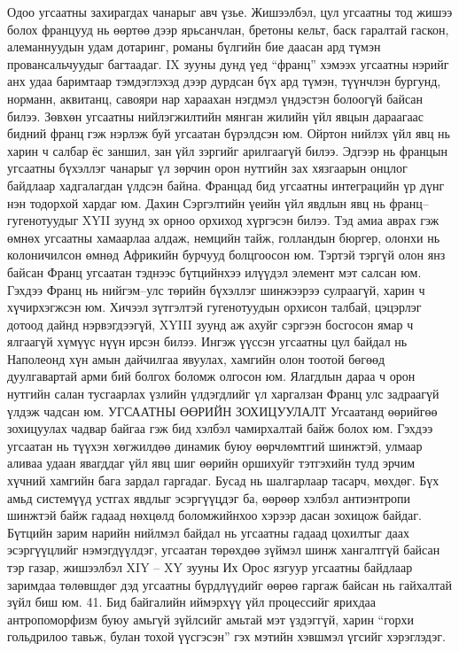 Одоо угсаатны захирагдах чанарыг авч үзье. Жишээлбэл, цул угсаатны тод жишээ болох францууд нь өөртөө дээр ярьсанчлан, бретоны кельт, баск гаралтай гаскон, алеманнуудын удам дотаринг, романы бүлгийн бие даасан ард түмэн провансальчуудыг багтаадаг. IX зууны дунд үед “франц” хэмээх угсаатны нэрийг анх удаа баримтаар тэмдэглэхэд дээр дурдсан бүх ард түмэн, түүнчлэн бургунд, норманн, аквитанц, савояри нар хараахан нэгдмэл үндэстэн болоогүй байсан билээ. Зөвхөн угсаатны нийлэгжилтийн мянган жилийн үйл явцын дараагаас бидний франц гэж нэрлэж буй угсаатан бүрэлдсэн юм. Ойртон нийлэх үйл явц нь харин ч салбар ёс заншил, зан үйл зэргийг арилгаагүй билээ. Эдгээр нь францын угсаатны бүхэллэг чанарыг үл зөрчин орон нутгийн зах хязгаарын онцлог байдлаар хадгалагдан үлдсэн байна.
Францад бид угсаатны интеграцийн үр дүнг нэн тодорхой хардаг юм. Дахин Сэргэлтийн үеийн үйл явдлын явц нь франц–гугенотуудыг XYII зуунд эх орноо орхиход хүргэсэн билээ. Тэд амиа аврах гэж өмнөх угсаатны хамаарлаа алдаж, немцийн тайж, голландын бюргер, олонхи нь колоничилсон өмнөд Африкийн бурчууд болцгоосон юм. Тэртэй тэргүй олон янз байсан Франц угсаатан тэднээс бүтцийнхээ илүүдэл элемент мэт салсан юм. Гэхдээ Франц нь нийгэм–улс төрийн бүхэллэг шинжээрээ сулраагүй, харин ч хүчирхэгжсэн юм. Хичээл зүтгэлтэй гугенотуудын орхисон талбай, цэцэрлэг дотоод дайнд нэрвэгдээгүй, XYIII зуунд аж ахуйг сэргээн босгосон ямар ч ялгаагүй хүмүүс нүүн ирсэн билээ. Ингэж үүссэн угсаатны цул байдал нь Наполеонд хүн амын дайчилгаа явуулах, хамгийн олон тоотой бөгөөд дуулгавартай арми бий болгох боломж олгосон юм. Ялагдлын дараа ч орон нутгийн салан тусгаарлах үзлийн үлдэгдлийг үл харгалзан Франц улс задраагүй үлдэж чадсан юм.
УГСААТНЫ ӨӨРИЙН ЗОХИЦУУЛАЛТ
Угсаатанд өөрийгөө зохицуулах чадвар байгаа гэж бид хэлбэл чамирхалтай байж болох юм. Гэхдээ угсаатан нь түүхэн хөгжилдөө динамик буюу өөрчлөмтгий шинжтэй, улмаар аливаа удаан явагддаг үйл явц шиг өөрийн оршихуйг тэтгэхийн тулд эрчим хүчний хамгийн бага зардал гаргадаг. Бусад нь шалгарлаар тасарч, мөхдөг. Бүх амьд системүүд устгах явдлыг эсэргүүцдэг ба, өөрөөр хэлбэл антиэнтропи шинжтэй байж гадаад нөхцөлд боломжийнхоо хэрээр дасан зохицож байдаг. Бүтцийн зарим нарийн нийлмэл байдал нь угсаатны гадаад цохилтыг даах эсэргүүцлийг нэмэгдүүлдэг, угсаатан төрөхдөө зүймэл шинж хангалтгүй байсан тэр газар, жишээлбэл XIY – XY зууны Их Орос язгуур угсаатны байдлаар заримдаа төлөвшдөг дэд угсаатны бүрдлүүдийг өөрөө гаргаж байсан нь гайхалтай зүйл биш юм.
41. Бид байгалийн иймэрхүү үйл процессийг ярихдаа антропоморфизм буюу амьгүй зүйлсийг амьтай мэт үздэггүй, харин “горхи гольдрилоо тавьж, булан тохой үүсгэсэн” гэх мэтийн хэвшмэл үгсийг хэрэглэдэг.
